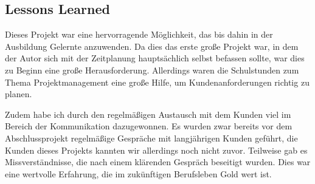 \subsection{Lessons Learned}
\label{sec:LessonsLearned}

Dieses Projekt war eine hervorragende Möglichkeit, das bis dahin in der Ausbildung Gelernte anzuwenden.
Da dies das erste große Projekt war, in dem der Autor sich mit der Zeitplanung hauptsächlich selbst befassen sollte, war dies zu Beginn eine große Herausforderung.
Allerdings waren die Schulstunden zum Thema Projektmanagement eine große Hilfe, um Kundenanforderungen richtig zu planen.

Zudem habe ich durch den regelmäßigen Austausch mit dem Kunden viel im Bereich der Kommunikation dazugewonnen.
Es wurden zwar bereits vor dem Abschlussprojekt regelmäßige Gespräche mit langjährigen Kunden geführt, die Kunden dieses Projekts kannten wir allerdings noch nicht zuvor.
Teilweise gab es Missverständnisse, die nach einem klärenden Gespräch beseitigt wurden.
Dies war eine wertvolle Erfahrung, die im zukünftigen Berufsleben Gold wert ist.
